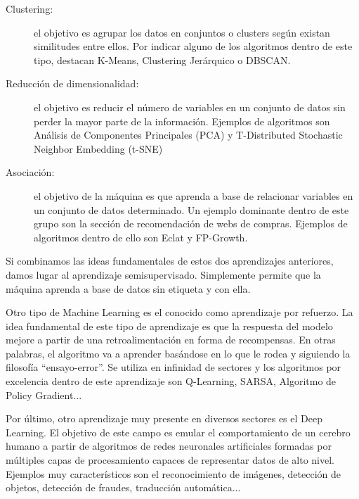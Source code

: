 \begin{description}
	\item[Clustering:] el objetivo es agrupar los datos en conjuntos o clusters según existan similitudes entre ellos. Por indicar alguno de los algoritmos dentro de este tipo, destacan K-Means, Clustering Jerárquico o DBSCAN.
	\item[Reducción de dimensionalidad:] el objetivo es reducir el número de variables en un conjunto de datos sin perder la mayor parte de la información. Ejemplos de algoritmos son Análisis de Componentes Principales (PCA) y T-Distributed Stochastic Neighbor Embedding (t-SNE)
	\item[Asociación:] el objetivo de la máquina es que aprenda a base de relacionar variables en un conjunto de datos determinado. Un ejemplo dominante dentro de este grupo son la sección de recomendación de webs de compras. Ejemplos de algoritmos dentro de ello son Eclat y FP-Growth.
\end{description}

	Si combinamos las ideas fundamentales de estos dos aprendizajes anteriores, damos lugar al aprendizaje semisupervisado. Simplemente permite que la máquina aprenda a base de datos sin etiqueta y con ella.
	
	Otro tipo de Machine Learning es el conocido como aprendizaje por refuerzo. La idea fundamental de este tipo de aprendizaje es que la respuesta del modelo mejore a partir de una retroalimentación en forma de recompensas. En otras palabras, el algoritmo va a aprender basándose en lo que le rodea y siguiendo la filosofía “ensayo-error”. Se utiliza en infinidad de sectores y los algoritmos por excelencia dentro de este aprendizaje son Q-Learning, SARSA, Algoritmo de Policy Gradient...
	
	Por último, otro aprendizaje muy presente en diversos sectores es el Deep Learning. El objetivo de este campo es emular el comportamiento de un cerebro humano a partir de algoritmos de redes neuronales artificiales formadas por múltiples capas de procesamiento capaces de representar datos de alto nivel. Ejemplos muy característicos son el reconocimiento de imágenes, detección de objetos, detección de fraudes, traducción automática...